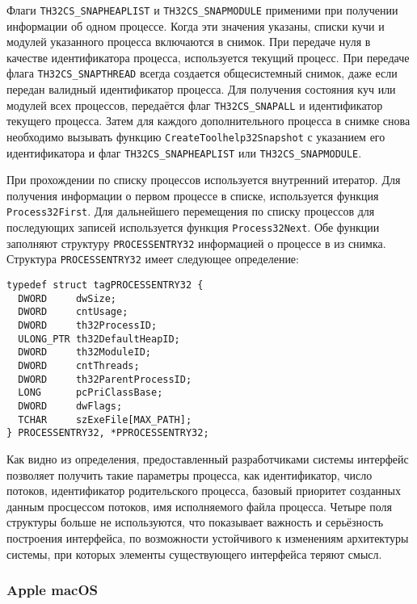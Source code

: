 Флаги \texttt{TH32CS\_SNAPHEAPLIST} и \texttt{TH32CS\_SNAPMODULE} применими при
получении информации об одном процессе. Когда эти значения указаны, списки кучи
и модулей указанного процесса включаются в снимок. При передаче нуля в качестве
идентификатора процесса, используется текущий процесс. При передаче флага
\texttt{TH32CS\_SNAPTHREAD} всегда создается общесистемный снимок, даже если
передан валидный идентификатор процесса.
Для получения состояния куч или модулей всех процессов, передаётся флаг
\texttt{TH32CS\_SNAPALL} и идентификатор текущего процесса. Затем для каждого
дополнительного процесса в снимке снова необходимо вызывать функцию
\texttt{CreateToolhelp32Snapshot} с указанием его идентификатора и флаг
\texttt{TH32CS\_SNAPHEAPLIST} или \texttt{TH32CS\_SNAPMODULE}.

При прохождении по списку процессов используется внутренний итератор. Для
получения информации о первом процессе в списке, используется функция
\texttt{Process32First}. Для дальнейшего перемещения по списку процессов для
последующих записей используется функция \texttt{Process32Next}. Обе функции
заполняют структуру \texttt{PROCESSENTRY32} информацией о процессе в из снимка.
Структура \texttt{PROCESSENTRY32} имеет следующее определение:

\medskip
\begin{lstlisting}[style=cstyle]
typedef struct tagPROCESSENTRY32 {
  DWORD     dwSize;
  DWORD     cntUsage;
  DWORD     th32ProcessID;
  ULONG_PTR th32DefaultHeapID;
  DWORD     th32ModuleID;
  DWORD     cntThreads;
  DWORD     th32ParentProcessID;
  LONG      pcPriClassBase;
  DWORD     dwFlags;
  TCHAR     szExeFile[MAX_PATH];
} PROCESSENTRY32, *PPROCESSENTRY32;
\end{lstlisting}
\medskip

Как видно из определения, предоставленный разработчиками системы интерфейс
позволяет получить такие параметры процесса, как идентификатор, число потоков,
идентификатор родительского процесса, базовый приоритет созданных данным
просцессом потоков, имя исполняемого файла процесса. Четыре поля структуры
больше не используются, что показывает важность и серьёзность построения
интерфейса, по возможности устойчивого к изменениям архитектуры системы, при
которых элементы существующего интерфейса теряют смысл.

\subsubsection{Apple macOS}
\label{sub:domain:analogs:macos}

